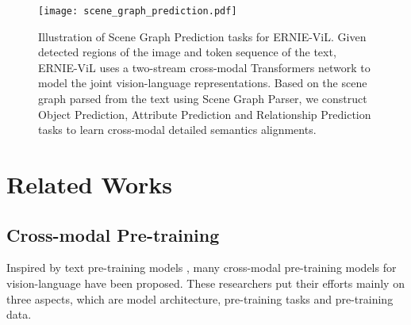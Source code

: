 \documentclass[letterpaper]{article} \usepackage{aaai21}  \usepackage{times}  \usepackage{helvet} \usepackage{courier}  \usepackage[hyphens]{url}  \usepackage{graphicx} \urlstyle{rm} \def\UrlFont{\rm}  \usepackage{natbib}  \usepackage{caption} \frenchspacing  \setlength{\pdfpagewidth}{8.5in}  \setlength{\pdfpageheight}{11in}  \usepackage{cite}
\begin{document}
\begin{figure*}[t]
    \centering
    \texttt{[image: scene\_graph\_prediction.pdf]}
    \caption{Illustration of Scene Graph Prediction tasks for ERNIE-ViL. Given detected regions of the image and token sequence of the text, ERNIE-ViL uses a two-stream cross-modal Transformers network to model the joint vision-language representations. Based on the scene graph parsed from the text using Scene Graph Parser, we construct Object Prediction, Attribute Prediction and Relationship Prediction tasks to learn cross-modal detailed semantics alignments.}
    \label{fig_framework}
\end{figure*}


\section{Related Works}
\subsection{Cross-modal Pre-training}
Inspired by text pre-training models \cite{devlin2018bert}, many cross-modal pre-training models for vision-language have been proposed.
These researchers put their efforts mainly on three aspects, which are model architecture, pre-training tasks and pre-training data.
\end{document}

